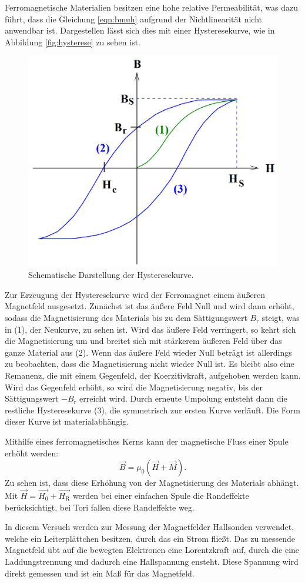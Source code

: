 Ferromagnetische Materialien besitzen eine hohe relative Permeabilität, was dazu führt, dass die Gleichung \eqref{eqn:bmuh} aufgrund der Nichtlinearität nicht 
anwendbar ist. Dargestellen lässt sich dies mit einer Hysteresekurve, wie in Abbildung \eqref{fig:hysterese} zu sehen ist.
 \begin{figure}[h!]
   \centering
   \includegraphics[width=0.6\linewidth]{hysteresekurve.png}
   \caption{Schematische Darstellung der Hysteresekurve.}
   \label{fig:hysterese}
   \end{figure}
Zur Erzeugung der Hysteresekurve wird der Ferromagnet einem äußeren Magnetfeld ausgesetzt. Zunächst ist das äußere Feld Null und wird dann erhöht, sodass die 
Magnetisierung des Materials bis zu dem Sättigungswert $B_{\text{r}}$ steigt, was in (1), der Neukurve, zu sehen ist. Wird das äußere Feld verringert, so kehrt sich die 
Magnetisierung um und breitet sich mit stärkerem äußeren Feld über das ganze Material aus (2). Wenn das äußere Feld wieder Null beträgt ist allerdings zu beobachten, 
dass die Magnetisierung nicht wieder Null ist. Es bleibt also eine Remanenz, die mit einem Gegenfeld, der Koerzitivkraft, aufgehoben werden kann. Wird das Gegenfeld 
erhöht, so wird die Magnetisierung negativ, bis der Sättigungswert $-B_{\text{r}}$ erreicht wird. Durch erneute Umpolung
entsteht dann die restliche Hysteresekurve (3), die symmetrisch zur ersten Kurve verläuft. Die Form dieser Kurve ist materialabhängig.

Mithilfe eines ferromagnetisches Kerns kann der magnetische Fluss einer Spule erhöht werden:
\begin{equation}
\vec{B} = \mu_0 (\vec{H} + \vec{M}).
\end{equation}
Zu sehen ist, dass diese Erhöhung von der Magnetisierung des Materials abhängt.  Mit $\vec{H} = \vec{H_0} + \vec{H_{\text{R}}}$ werden bei einer einfachen Spule die
Randeffekte berücksichtigt, bei Tori fallen diese Randeffekte weg.

In diesem Versuch werden zur Messung der Magnetfelder Hallsonden verwendet, welche ein Leiterplättchen besitzen, durch das ein Strom fließt. Das zu messende Magnetfeld
übt auf die bewegten Elektronen eine Lorentzkraft auf, durch die eine Laddungstrennung und dadurch eine Hallspannung ensteht. Diese Spannung wird direkt gemessen und ist ein
Maß für das Magnetfeld. 